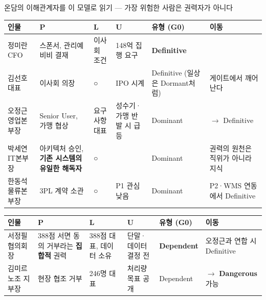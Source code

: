 \begin{frame}[allowframebreaks=1.0]{온담의 이해관계자를 이 모델로 읽기 — 가장 위험한 사람은 권력자가 아니다}
\small
{\footnotesize\setlength{\tabcolsep}{3pt}\renewcommand{\arraystretch}{1.12}
\begin{tabular}{@{}>{\raggedright\arraybackslash}p{}>{\raggedright\arraybackslash}p{}>{\raggedright\arraybackslash}p{}>{\raggedright\arraybackslash}p{}>{\raggedright\arraybackslash}p{}>{\raggedright\arraybackslash}p{}@{}}
\toprule
\textbf{인물} & \textbf{P} & \textbf{L} & \textbf{U} & \textbf{유형 (G0)} & \textbf{이동} \\
\midrule
정미란 CFO & 스폰서, 관리예비비 결재 & 이사회 조건 & 148억 집행 요구 & \textbf{Definitive} &  \\
김선호 대표 & 이사회 의장 & ○ & IPO 시계 & Definitive (일상은 Dormant처럼) & 게이트에서 깨어난다 \\
오정근 영업본부장 & Senior User, 가맹 협상 & 요구사항 대표 & 성수기·가맹 반발 시 급등 & Dominant & $\rightarrow$ Definitive \\
박세연 IT본부장 & 아키텍처 승인, \textbf{기존 시스템의 유일한 해독자} & ○ &  & Dominant & 권력의 원천은 직위가 아니라 지식 \\
한동석 물류본부장 & 3PL 계약 소관 & ○ & P1 관심 낮음 & Dominant & P2·WMS 연동에서 Definitive \\
\bottomrule
\end{tabular}}
\par\smallskip
\framebreak
{\footnotesize\setlength{\tabcolsep}{3pt}\renewcommand{\arraystretch}{1.12}
\begin{tabular}{@{}>{\raggedright\arraybackslash}p{}>{\raggedright\arraybackslash}p{}>{\raggedright\arraybackslash}p{}>{\raggedright\arraybackslash}p{}>{\raggedright\arraybackslash}p{}>{\raggedright\arraybackslash}p{}@{}}
\toprule
\textbf{인물} & \textbf{P} & \textbf{L} & \textbf{U} & \textbf{유형 (G0)} & \textbf{이동} \\
\midrule
서정필 협의회장 & 388점 서면 동의 거부라는 \textbf{집합적} 권력 & 388점 대표, 데이터 소유 & 단말·데이터 결정 전 & \textbf{Dependent} & 오정근과 연합 시 Definitive \\
김미르 노조 지부장 & 현장 협조 거부 & 246명 대표 & 처리량 목표 공개 & Dependent & $\rightarrow$ \textbf{Dangerous} 가능 \\

\end{tabular}}
\end{frame}
